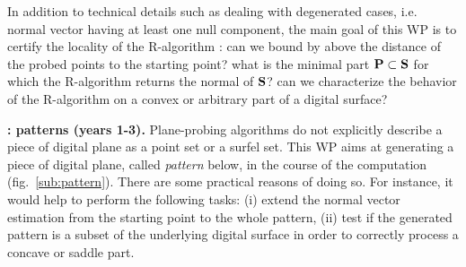 In addition to technical details such as dealing with degenerated cases, 
i.e. normal vector having at least one null component, the main goal of this WP is to 
certify the locality of the R-algorithm \cite{LPRJMIV2017}: 
can we bound by above the distance of the probed points to the starting point? 
what is the minimal part $\mathbf{P} \subset \mathbf{S}$ for which the R-algorithm returns the normal of $\mathbf{S}$?
can we characterize the behavior of the R-algorithm on a convex or arbitrary part of a digital surface?


\noindent\textbf{\wpPattern: patterns (years 1-3).}
Plane-probing algorithms 
do not explicitly describe a piece of digital plane as a point set or a surfel set.  
This WP aims at generating a piece of digital plane, called \emph{pattern} below, in the course of the computation (fig.~\ref{sub:pattern}).
There are some practical reasons of doing so. For instance, it would help to perform the following tasks: 
(i) extend the normal vector estimation from the starting point to the whole pattern, 
(ii) test if the generated pattern is a subset of the underlying digital surface 
in order to correctly process a concave or saddle part.

